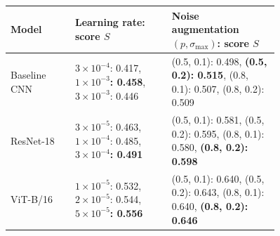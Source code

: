 \begin{tabular}{lp{0.36\linewidth}p{0.40\linewidth}}
\toprule
Model & Learning rate: score $S$ & Noise augmentation $(p, \sigma_{\max})$: score $S$ \\
\midrule
Baseline CNN & $3{\times}10^{-4}$: 0.417, \textbf{$1{\times}10^{-3}$: 0.458}, $3{\times}10^{-3}$: 0.446 & (0.5, 0.1): 0.498, \textbf{(0.5, 0.2): 0.515}, (0.8, 0.1): 0.507, (0.8, 0.2): 0.509 \\
ResNet-18 & $3{\times}10^{-5}$: 0.463, $1{\times}10^{-4}$: 0.485, \textbf{$3{\times}10^{-4}$: 0.491} & (0.5, 0.1): 0.581, (0.5, 0.2): 0.595, (0.8, 0.1): 0.580, \textbf{(0.8, 0.2): 0.598} \\
ViT-B/16 & $1{\times}10^{-5}$: 0.532, $2{\times}10^{-5}$: 0.544, \textbf{$5{\times}10^{-5}$: 0.556} & (0.5, 0.1): 0.640, (0.5, 0.2): 0.643, (0.8, 0.1): 0.640, \textbf{(0.8, 0.2): 0.646} \\
\bottomrule
\end{tabular}
